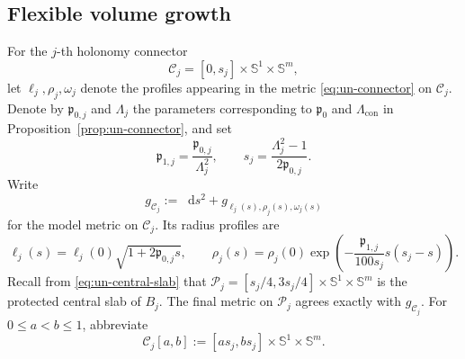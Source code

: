 \documentclass[11pt,reqno]{amsart}
\theoremstyle{definition}
\numberwithin{equation}{section}
\newcommand{\dd}{\mathop{}\!\mathrm d}
\begin{document}
\subsection{Flexible volume growth}
For the $j$-th holonomy connector
\[
 \mathcal C_j=[0,s_j]\times\mathbb S^1\times\mathbb S^m,
\]
let $\ell_j,\rho_j,\omega_j$ denote the profiles appearing in the metric
\eqref{eq:un-connector} on $\mathcal C_j$.  Denote by
$\mathfrak p_{0,j}$ and $\Lambda_j$ the parameters corresponding to
$\mathfrak p_0$ and $\Lambda_{\mathrm{con}}$ in
Proposition~\ref{prop:un-connector}, and set
\[
 \mathfrak p_{1,j}
 =\frac{\mathfrak p_{0,j}}{\Lambda_j^2},
 \qquad
 s_j
 =\frac{\Lambda_j^2-1}{2\mathfrak p_{0,j}}.
 \tag{8.13}\label{eq:indexed-connector-parameters}
\]
Write
\[
 g_{\mathcal C_j}
 :=
 \dd s^2+g_{\ell_j(s),\rho_j(s),\omega_j(s)}
\]
for the model metric on $\mathcal C_j$.  Its radius profiles are
\[
 \ell_j(s)
 =\ell_j(0)\sqrt{1+2\mathfrak p_{0,j}s},
 \qquad
 \rho_j(s)
 =\rho_j(0)
 \exp\left(
   -\frac{\mathfrak p_{1,j}}{100s_j}s(s_j-s)
 \right).
 \tag{8.14}\label{eq:indexed-connector-functions}
\]
Recall from \eqref{eq:un-central-slab} that
$\mathcal P_j=[s_j/4,3s_j/4]\times\mathbb S^1\times\mathbb S^m$ is the
protected central slab of $B_j$.  The final metric on $\mathcal P_j$
agrees exactly with $g_{\mathcal C_j}$.  For
$0\le a<b\le1$, abbreviate
\[
 \mathcal C_j[a,b]
 :=
 [as_j,bs_j]\times\mathbb S^1\times\mathbb S^m.
\]
\end{document}
